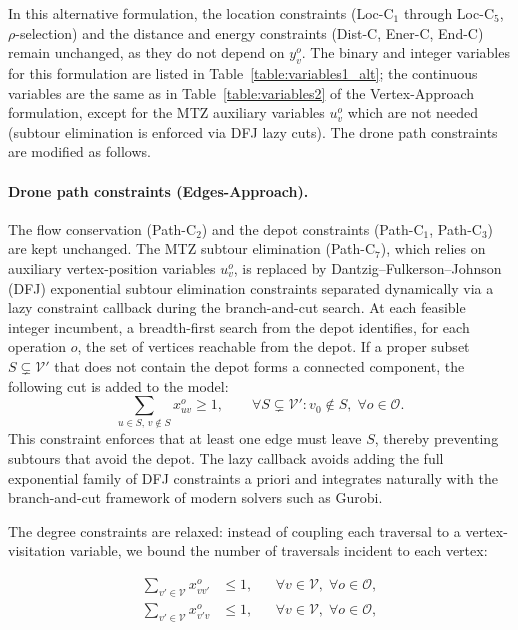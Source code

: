 \documentclass[12pt]{elsarticle}
\begin{document}
In this alternative formulation, the location constraints (Loc-C$_1$ through Loc-C$_5$, $\rho$-selection) and the distance and energy constraints (Dist-C, Ener-C, End-C) remain unchanged, as they do not depend on $y_v^o$. The binary and integer variables for this formulation are listed in Table~\ref{table:variables1_alt}; the continuous variables are the same as in Table~\ref{table:variables2} of the Vertex-Approach formulation, except for the MTZ auxiliary variables $u_v^o$ which are not needed (subtour elimination is enforced via DFJ lazy cuts). The drone path constraints are modified as follows.

\paragraph{Drone path constraints (Edges-Approach).}
The flow conservation (Path-C$_2$) and the depot constraints (Path-C$_1$, Path-C$_3$) are kept unchanged.  The MTZ subtour elimination (Path-C$_7$), which relies on auxiliary vertex-position variables $u_v^o$, is replaced by Dantzig--Fulkerson--Johnson (DFJ) exponential subtour elimination constraints separated dynamically via a lazy constraint callback during the branch-and-cut search. At each feasible integer incumbent, a breadth-first search from the depot identifies, for each operation $o$, the set of vertices reachable from the depot. If a proper subset $S\subsetneq\mathcal V'$ that does not contain the depot forms a connected component, the following cut is added to the model:
%
\begin{equation}
    \sum_{u\in S,\,v\notin S} x_{uv}^o \geq 1,
    \qquad \forall S\subsetneq\mathcal V': v_0\notin S,\; \forall o\in\mathcal O.
    \label{eq:dfj_cut}\tag{DFJ-C$_1$}
\end{equation}
%
This constraint enforces that at least one edge must leave $S$, thereby preventing subtours that avoid the depot. The lazy callback avoids adding the full exponential family of DFJ constraints a priori and integrates naturally with the branch-and-cut framework of modern solvers such as Gurobi.

The degree constraints are relaxed: instead of coupling each traversal to a vertex-visitation variable, we bound the number of traversals incident to each vertex:

\begin{align}
    \sum_{v'\in\mathcal V} x_{vv'}^o &\le 1, &&\forall v\in\mathcal V,\;\forall o\in\mathcal O,\label{eq:deg_out}\tag{Path-C$'_4$}\\
    \sum_{v'\in\mathcal V} x_{v'v}^o &\le 1, &&\forall v\in\mathcal V,\;\forall o\in\mathcal O,\label{eq:deg_in}\tag{Path-C$'_5$}
\end{align}
\end{document}
